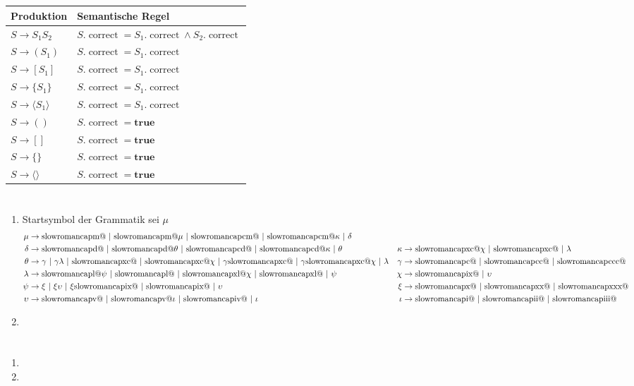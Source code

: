 \documentclass[a4paper,10pt]{scrartcl}
\makeatletter
\newcommand{\Rm}[1]{\textrm{\expandafter\@slowromancap\romannumeral #1@}}
\makeatother
\begin{document}
\section{}
\begin{center}
\begin{tabular}{l|l}
\textbf{Produktion}         & \textbf{Semantische Regel} \\\hline
$S \to S_1S_2$              & $S.\operatorname{correct} = S_1.\operatorname{correct} \land S_2.\operatorname{correct}$\\
$S \to (S_1)$               & $S.\operatorname{correct} = S_1.\operatorname{correct}$\\
$S \to [S_1]$               & $S.\operatorname{correct} = S_1.\operatorname{correct}$\\
$S \to \{S_1\}$             & $S.\operatorname{correct} = S_1.\operatorname{correct}$\\
$S \to \langle S_1\rangle$  & $S.\operatorname{correct} = S_1.\operatorname{correct}$\\
$S \to ()$                  & $S.\operatorname{correct} = \mathbf{true}$\\
$S \to []$                  & $S.\operatorname{correct} = \mathbf{true}$\\
$S \to \{\}$                & $S.\operatorname{correct} = \mathbf{true}$\\
$S \to \langle\rangle$      & $S.\operatorname{correct} = \mathbf{true}$\\
\end{tabular}
\end{center}

\section{}
\begin{enumerate}
 \item  Startsymbol der Grammatik sei $\mu$
        \begin{align*}
         \mu &\to \Rm{1000}\ |\ \Rm{1000}\mu\ |\ \Rm{900}\ |\ \Rm{900}\kappa\ |\ \delta && \\
         \delta &\to \Rm{500}\ |\ \Rm{500}\theta\ |\ \Rm{400}\ |\ \Rm{400}\kappa\ |\ \theta &
            \kappa &\to \Rm{90}\chi\ |\ \Rm{90}\ |\ \lambda \\
        \theta &\to \gamma\ |\ \gamma\lambda\ |\ \Rm{90}\ |\ \Rm{90}\chi\ |\ \gamma \Rm{90}\ |\ \gamma \Rm{90}\chi\ |\ \lambda &
            \gamma &\to \Rm{100}\ |\ \Rm{200}\ |\ \Rm{300} \\
        \lambda &\to \Rm{50}\psi\ |\ \Rm{50}\ |\ \Rm{40}\chi\ |\ \Rm{40}\ |\ \psi &
            \chi &\to \Rm{9}\ |\ \upsilon \\
        \psi &\to \xi\ |\ \xi\upsilon\ |\ \xi \Rm{9}\ |\ \Rm{9}\ |\ \upsilon &
            \xi &\to \Rm{10}\ |\ \Rm{20}\ |\ \Rm{30} \\
        \upsilon &\to \Rm{5}\ |\ \Rm{5}\iota\ |\ \Rm{4}\ |\ \iota &
            \iota &\to \Rm{1}\ |\ \Rm{2}\ |\ \Rm{3}
        \end{align*}
 \item  
\end{enumerate}

\section{}
\begin{enumerate}
 \item  
 \item  
\end{enumerate}
\end{document}
